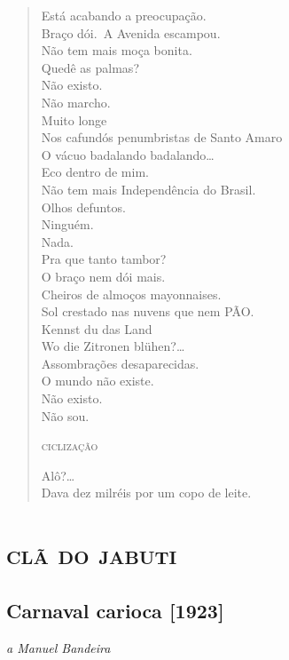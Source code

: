 \begin{verse}
Está acabando a preocupação.\\
Braço dói.\
A Avenida escampou.\\
Não tem mais moça bonita.\\
Quedê as palmas?\\
Não existo.\\
Não marcho.\\
Muito longe\\
Nos cafundós penumbristas de Santo Amaro\\
O vácuo badalando badalando\ldots{}\\
Eco dentro de mim.\\
Não tem mais Independência do Brasil.\\
Olhos defuntos.\\
Ninguém.\\
Nada.\\
Pra que tanto tambor?\\
O braço nem dói mais.\\
Cheiros de almoços mayonnaises.\\
Sol crestado nas nuvens que nem PÃO.\\
\qquad\qquad Kennst du das Land\\
\qquad\qquad Wo die Zitronen blühen?\ldots{}\\
\qquad\qquad\qquad\qquad  Assombrações desaparecidas.\\
\qquad\qquad\qquad\qquad\qquad  O mundo não existe.\\
\qquad\qquad\qquad\qquad\qquad\qquad Não existo.\\
\qquad\qquad\qquad\qquad\qquad\qquad Não sou.

\qquad\qquad\qquad\quad\textsc{ciclização}

\qquad\qquad\qquad\qquad\qquad Alô?\ldots{}\\
Dava dez milréis por um copo de leite.
\end{verse}

\chapter{\textsc{clã do jabuti}}

\section{Carnaval carioca [1923]}

\hfill\emph{a Manuel Bandeira}

